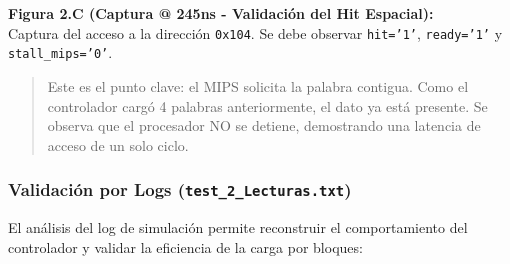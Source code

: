 \documentclass[12pt,a4paper]{article}
\begin{document}
\textbf{Figura 2.C (Captura @ 245ns - Validación del Hit Espacial):} \\
Captura del acceso a la dirección \texttt{0x104}. Se debe observar \texttt{hit='1'}, \texttt{ready='1'} y \texttt{stall\_mips='0'}.
\begin{quote}
     Este es el punto clave: el MIPS solicita la palabra contigua. Como el controlador cargó 4 palabras anteriormente, el dato ya está presente. Se observa que el procesador NO se detiene, demostrando una latencia de acceso de un solo ciclo.
\end{quote}

\subsubsection{Validación por Logs (\texttt{test\_2\_Lecturas.txt})}

El análisis del log de simulación permite reconstruir el comportamiento del controlador y validar la eficiencia de la carga por bloques:
\end{document}
